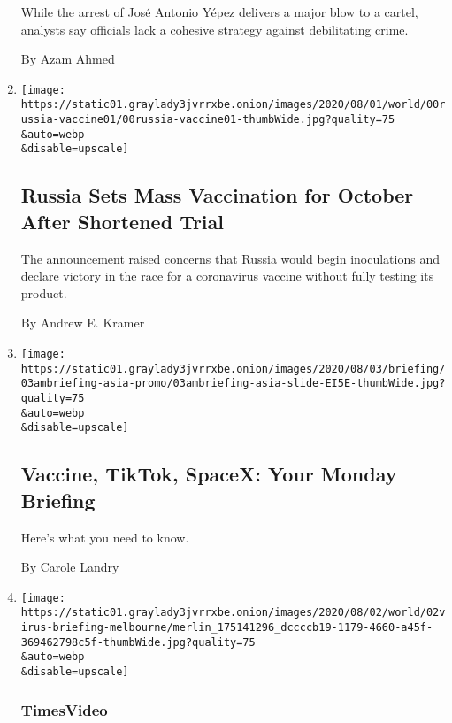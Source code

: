 \begin{enumerate}
  While the arrest of José Antonio Yépez delivers a major blow to a
  cartel, analysts say officials lack a cohesive strategy against
  debilitating crime.

  By Azam Ahmed
\item
  \href{/2020/08/02/world/europe/russia-trials-vaccine-October.html}{}

  \texttt{[image: https://static01.graylady3jvrrxbe.onion/images/2020/08/01/world/00russia-vaccine01/00russia-vaccine01-thumbWide.jpg?quality=75\\\&auto=webp\\\&disable=upscale]}

  \hypertarget{russia-sets-mass-vaccination-for-october-after-shortened-trial}{%
  \subsection{Russia Sets Mass Vaccination for October After Shortened
  Trial}\label{russia-sets-mass-vaccination-for-october-after-shortened-trial}}

  The announcement raised concerns that Russia would begin inoculations
  and declare victory in the race for a coronavirus vaccine without
  fully testing its product.

  By Andrew E. Kramer
\item
  \href{/2020/08/02/briefing/coronavirus-vaccine-india-us-tiktok-spacex.html}{}

  \texttt{[image: https://static01.graylady3jvrrxbe.onion/images/2020/08/03/briefing/03ambriefing-asia-promo/03ambriefing-asia-slide-EI5E-thumbWide.jpg?quality=75\\\&auto=webp\\\&disable=upscale]}

  \hypertarget{vaccine-tiktok-spacex-your-monday-briefing}{%
  \subsection{Vaccine, TikTok, SpaceX: Your Monday
  Briefing}\label{vaccine-tiktok-spacex-your-monday-briefing}}

  Here's what you need to know.

  By Carole Landry
\item
  \href{/video/world/australia/100000007269116/coronavirus-restrictions-melbourne.html}{}

  \texttt{[image: https://static01.graylady3jvrrxbe.onion/images/2020/08/02/world/02virus-briefing-melbourne/merlin\_175141296\_dccccb19-1179-4660-a45f-369462798c5f-thumbWide.jpg?quality=75\\\&auto=webp\\\&disable=upscale]}

  \hypertarget{timesvideo}{%
  \subsubsection{TimesVideo}\label{timesvideo}}


\end{enumerate}
